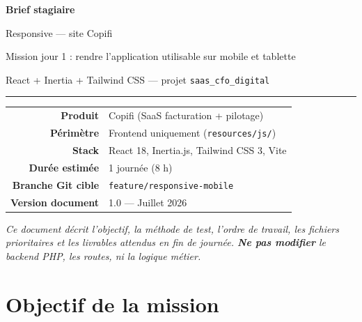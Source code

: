 \documentclass[11pt,a4paper]{report}
\newcommand{\filepath}[1]{\texttt{\small #1}}
\begin{document}
\begin{titlepage}
    \centering
    \vspace*{1.2cm}
    {\Huge\bfseries\color{copifiobsidian} Brief stagiaire\par}
    \vspace{0.6cm}
    {\LARGE\color{copifiemerald} Responsive — site Copifi\par}
    \vspace{0.4cm}
    {\large Mission jour 1 : rendre l'application utilisable sur mobile et tablette\par}
    \vspace{0.3cm}
    {\normalsize React + Inertia + Tailwind CSS — projet \filepath{saas\_cfo\_digital}\par}
    \vspace{1.4cm}
    \rule{0.78\textwidth}{1pt}
    \vspace{1cm}
    \begin{tabular}{>{\bfseries}r p{9.2cm}}
        Produit & Copifi (SaaS facturation + pilotage) \\
        Périmètre & Frontend uniquement (\filepath{resources/js/}) \\
        Stack & React 18, Inertia.js, Tailwind CSS 3, Vite \\
        Durée estimée & 1 journée (8 h) \\
        Branche Git cible & \filepath{feature/responsive-mobile} \\
        Version document & 1.0 — Juillet 2026 \\
    \end{tabular}
    \vfill
    \begin{minipage}{0.88\textwidth}
        \centering
        \small\itshape
        Ce document décrit l'objectif, la méthode de test, l'ordre de travail,
        les fichiers prioritaires et les livrables attendus en fin de journée.
        \textbf{Ne pas modifier} le backend PHP, les routes, ni la logique métier.
    \end{minipage}
\end{titlepage}

\tableofcontents
\cleardoublepage

\chapter{Objectif de la mission}
\end{document}
